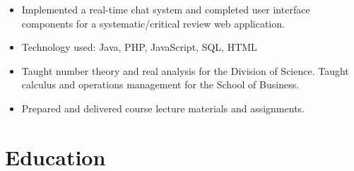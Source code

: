 \documentclass[11pt,letterpaper,sans]{moderncv}   %
\begin{document}
{\begin{itemize}%
  \item Implemented a real-time chat system and completed user interface
  components for a systematic/critical review web application.
  \item Technology used: Java, PHP, JavaScript, SQL, HTML
\end{itemize}}
\vspace{11pt}

{\begin{itemize}%
  \item Taught number theory and real analysis for the Division of Science.
  Taught calculus and operations management for the School of Business.
  \item Prepared and delivered course lecture materials and assignments.
\end{itemize}}
\newpage

\section{Education}


\end{document}

